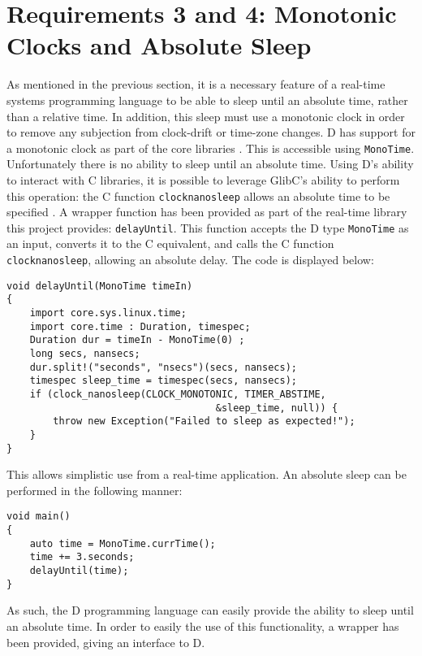 \section{Requirements 3 and 4: Monotonic Clocks and Absolute Sleep}
As mentioned in the previous section, it is a necessary feature of a real-time 
systems programming language to be able to sleep until an absolute time, rather 
than a relative time. In addition, this sleep must use a monotonic clock in order 
to remove any subjection from clock-drift or time-zone changes. D has support 
for a monotonic clock as part of the core libraries 
\cite{dlang-core-time}. This is accessible using 
\texttt{MonoTime}. Unfortunately there is no ability to sleep until an 
absolute time. Using D's ability to interact with C libraries, it is possible 
to leverage GlibC's ability to perform this operation: the C function 
\texttt{clock\textunderscore{}nanosleep} allows an absolute time to be specified
\cite{clock-nanosleep}.
A wrapper function has been provided as part of the real-time library this 
project provides: \texttt{delayUntil}.
This function accepts the D type \texttt{MonoTime} as an input, converts it to the C 
equivalent, and calls the C function \texttt{clock\textunderscore{}nanosleep}, 
allowing an absolute delay. The code is displayed below: 
\begin{lstlisting}
void delayUntil(MonoTime timeIn)
{
    import core.sys.linux.time; 
    import core.time : Duration, timespec; 
    Duration dur = timeIn - MonoTime(0) ;
    long secs, nansecs; 
    dur.split!("seconds", "nsecs")(secs, nansecs); 
    timespec sleep_time = timespec(secs, nansecs); 
    if (clock_nanosleep(CLOCK_MONOTONIC, TIMER_ABSTIME, 
                                    &sleep_time, null)) {
        throw new Exception("Failed to sleep as expected!"); 
    }
}
\end{lstlisting}
This allows simplistic use from a real-time application. An absolute sleep can 
be performed in the following manner: 
\begin{lstlisting}
void main()
{
    auto time = MonoTime.currTime(); 
    time += 3.seconds; 
    delayUntil(time);
}
\end{lstlisting}
As such, the D programming language can easily provide the ability to sleep 
until an absolute time. In order to easily the use of this functionality, a 
wrapper has been provided, giving an interface to D.

